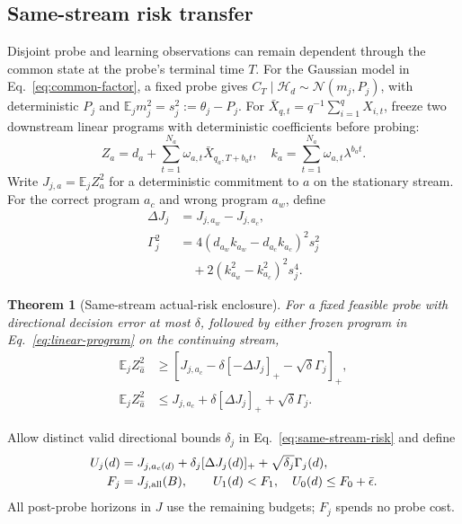 \documentclass[journal]{IEEEtran}
\newtheorem{theorem}{Theorem}
\newcommand{\E}{\mathbb{E}}
\begin{document}
\subsection{Same-stream risk transfer}
Disjoint probe and learning observations can remain dependent through the common state at the probe's terminal time $T$.
For the Gaussian model in Eq.~\eqref{eq:common-factor}, a fixed probe gives $C_T\mid\mathcal H_d\sim\mathcal N(m_j,P_j)$, with deterministic $P_j$ and $\E_jm_j^2=s_j^2:=\theta_j-P_j$.
For $\bar X_{q,t}=q^{-1}\sum_{i=1}^qX_{i,t}$, freeze two downstream linear programs with deterministic coefficients before probing:
\begin{equation}
Z_a=d_a+\sum_{t=1}^{N_a}\omega_{a,t}\bar X_{q_a,T+b_at},
\quad
k_a=\sum_{t=1}^{N_a}\omega_{a,t}\lambda^{b_at}.
\label{eq:linear-program}
\end{equation}
Write $J_{j,a}=\E_jZ_a^2$ for a deterministic commitment to $a$ on the stationary stream.
For the correct program $a_c$ and wrong program $a_w$, define
\begin{align}
\Delta J_j&=J_{j,a_w}-J_{j,a_c},\nonumber\\
\Gamma_j^2&=4(d_{a_w}k_{a_w}-d_{a_c}k_{a_c})^2s_j^2\nonumber\\
&\quad+2(k_{a_w}^2-k_{a_c}^2)^2s_j^4.
\label{eq:selection-carryover}
\end{align}
\begin{theorem}[Same-stream actual-risk enclosure]
For a fixed feasible probe with directional decision error at most $\delta$, followed by either frozen program in Eq.~\eqref{eq:linear-program} on the continuing stream,
\begin{align}
\E_jZ_{\widehat a}^2
&\ge\left[J_{j,a_c}-\delta[-\Delta J_j]_+-\sqrt\delta\Gamma_j\right]_+,\nonumber\\
\E_jZ_{\widehat a}^2
&\le J_{j,a_c}+\delta[\Delta J_j]_++\sqrt\delta\Gamma_j.
\label{eq:same-stream-risk}
\end{align}
\label{thm:same-stream}
\end{theorem}
Allow distinct valid directional bounds $\delta_j$ in Eq.~\eqref{eq:same-stream-risk} and define
\begin{align}
U_j(d)&=J_{j,a_c(d)}+\delta_j[\Delta J_j(d)]_+
+\sqrt{\delta_j}\Gamma_j(d),\nonumber\\
F_j&=J_{j,{\rm all}}(B),\qquad
U_1(d)<F_1,\quad U_0(d)\le F_0+\bar\epsilon.
\label{eq:actual-admission}
\end{align}
All post-probe horizons in $J$ use the remaining budgets; $F_j$ spends no probe cost.
\end{document}
